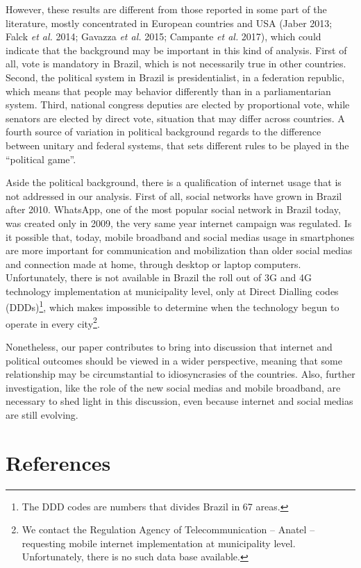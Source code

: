 \documentclass[
  12pt,
]{article}
\begin{document}
However, these results are different from those reported in some part of
the literature, mostly concentrated in European countries and USA (Jaber
2013; Falck \emph{et al.} 2014; Gavazza \emph{et al.} 2015; Campante
\emph{et al.} 2017), which could indicate that the background may be
important in this kind of analysis. First of all, vote is mandatory in
Brazil, which is not necessarily true in other countries. Second, the
political system in Brazil is presidentialist, in a federation republic,
which means that people may behavior differently than in a
parliamentarian system. Third, national congress deputies are elected by
proportional vote, while senators are elected by direct vote, situation
that may differ across countries. A fourth source of variation in
political background regards to the difference between unitary and
federal systems, that sets different rules to be played in the
``political game''.

Aside the political background, there is a qualification of internet
usage that is not addressed in our analysis. First of all, social
networks have grown in Brazil after 2010. WhatsApp, one of the most
popular social network in Brazil today, was created only in 2009, the
very same year internet campaign was regulated. Is it possible that,
today, mobile broadband and social medias usage in smartphones are more
important for communication and mobilization than older social medias
and connection made at home, through desktop or laptop computers.
Unfortunately, there is not available in Brazil the roll out of 3G and
4G technology implementation at municipality level, only at Direct
Dialling codes (DDDs)\footnote{The DDD codes are numbers that divides
  Brazil in 67 areas.}, which makes impossible to determine when the
technology begun to operate in every city\footnote{We contact the
  Regulation Agency of Telecommunication -- Anatel -- requesting mobile
  internet implementation at municipality level. Unfortunately, there is
  no such data base available.}.

Nonetheless, our paper contributes to bring into discussion that
internet and political outcomes should be viewed in a wider perspective,
meaning that some relationship may be circumstantial to idiosyncrasies
of the countries. Also, further investigation, like the role of the new
social medias and mobile broadband, are necessary to shed light in this
discussion, even because internet and social medias are still evolving.

\hypertarget{references}{%
\section*{References}\label{references}}
\end{document}
